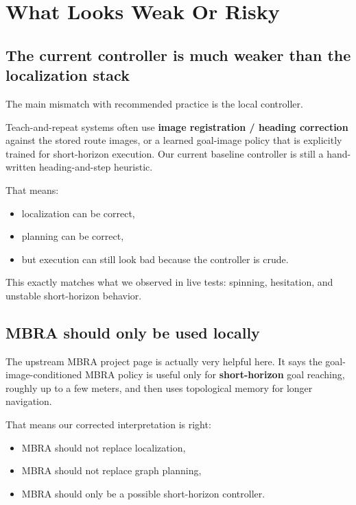 \documentclass[11pt,a4paper]{article}
\begin{document}
\section{What Looks Weak Or Risky}

\subsection{The current controller is much weaker than the localization stack}

The main mismatch with recommended practice is the local controller.

Teach-and-repeat systems often use \textbf{image registration / heading
correction} against the stored route images, or a learned goal-image policy
that is explicitly trained for short-horizon execution.  Our current baseline
controller is still a hand-written heading-and-step heuristic.

That means:

\begin{itemize}[nosep]
  \item localization can be correct,
  \item planning can be correct,
  \item but execution can still look bad because the controller is crude.
\end{itemize}

This exactly matches what we observed in live tests: spinning, hesitation, and
unstable short-horizon behavior.

\subsection{MBRA should only be used locally}

The upstream MBRA project page is actually very helpful here.  It says the
goal-image-conditioned MBRA policy is useful only for \textbf{short-horizon}
goal reaching, roughly up to a few meters, and then uses topological memory for
longer navigation.

That means our corrected interpretation is right:

\begin{itemize}[nosep]
  \item MBRA should not replace localization,
  \item MBRA should not replace graph planning,
  \item MBRA should only be a possible short-horizon controller.
\end{itemize}
\end{document}
